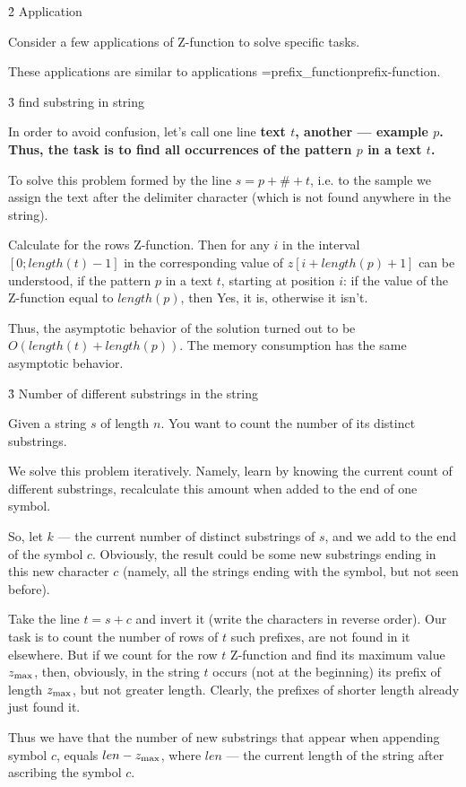 \h2{ Application }

Consider a few applications of Z-function to solve specific tasks.

These applications are similar to applications \algohref=prefix_function{prefix-function}.


\h3{ find substring in string }

In order to avoid confusion, let's call one line \bf{text} $t$, another --- \bf{example} $p$. Thus, the task is to find all occurrences of the pattern $p$ in a text $t$.

To solve this problem formed by the line $s = p + \# + t$, i.e. to the sample we assign the text after the delimiter character (which is not found anywhere in the string).

Calculate for the rows Z-function. Then for any $i$ in the interval $[0; length(t)-1]$ in the corresponding value of $z[i + length(p) + 1]$ can be understood, if the pattern $p$ in a text $t$, starting at position $i$: if the value of the Z-function equal to $length(p)$, then Yes, it is, otherwise it isn't.

Thus, the asymptotic behavior of the solution turned out to be $O (length(t) + length(p))$. The memory consumption has the same asymptotic behavior.


\h3{ Number of different substrings in the string }

Given a string $s$ of length $n$. You want to count the number of its distinct substrings.

We solve this problem iteratively. Namely, learn by knowing the current count of different substrings, recalculate this amount when added to the end of one symbol.

So, let $k$ --- the current number of distinct substrings of $s$, and we add to the end of the symbol $c$. Obviously, the result could be some new substrings ending in this new character $c$ (namely, all the strings ending with the symbol, but not seen before).

Take the line $t=s+c$ and invert it (write the characters in reverse order). Our task is to count the number of rows of $t$ such prefixes, are not found in it elsewhere. But if we count for the row $t$ Z-function and find its maximum value $z_{\rm max}$, then, obviously, in the string $t$ occurs (not at the beginning) its prefix of length $z_{\rm max}$, but not greater length. Clearly, the prefixes of shorter length already just found it.

Thus we have that the number of new substrings that appear when appending symbol $c$, equals $len - z_{\rm max}$, where $len$ --- the current length of the string after ascribing the symbol $c$.

